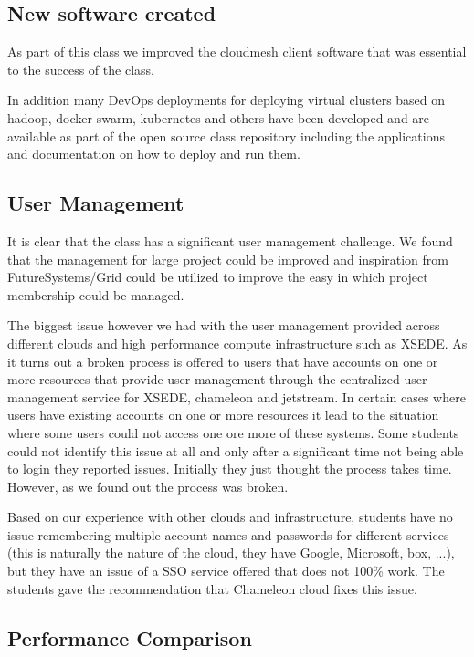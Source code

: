 \documentclass[sigconf]{acmart}
\begin{document}
\subsection{New software created}

As part of this class we improved the cloudmesh client software
\cite{www-cloudmesh-client}\cite{www-cloudmesh-cmd5}
\cite{www-cloudmesh-rest} that was essential to the success of the
class.

In addition many DevOps deployments for deploying virtual clusters
based on hadoop, docker swarm, kubernetes and others have been
developed and are available as part of the open source class repository
including the applications and documentation on how to deploy and run
them.

\subsection{User Management}

It is clear that the class has a significant user management
challenge. We found that the management for large project could be
improved and inspiration from FutureSystems/Grid could be utilized to
improve the easy in which project membership could be managed.

The biggest issue however we had with the user management provided
across different clouds and high performance compute infrastructure
such as XSEDE. As it turns out a broken process is offered to users
that have accounts on one or more resources that provide user
management through the centralized user management service for XSEDE,
chameleon and jetstream. In certain cases where users have existing
accounts on one or more resources it lead to the situation where some
users could not access one ore more of these systems. Some students
could not identify this issue at all and only after a significant time
not being able to login they reported issues. Initially they just
thought the process takes time. However, as we found out the process
was broken. 

Based on our experience with other clouds and infrastructure, students
have no issue remembering multiple account names and passwords for
different services (this is naturally the nature of the cloud, they
have Google, Microsoft, box, ...), but they have an issue of a SSO
service offered that does not 100\% work. The students gave the
recommendation that Chameleon cloud fixes this issue.

\subsection{Performance Comparison}
\end{document}
